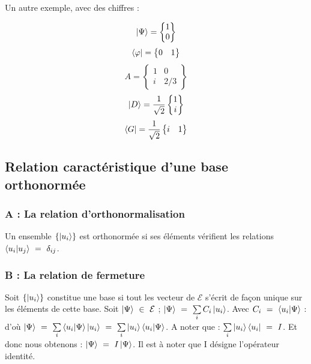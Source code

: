 \documentclass[12pt,a4paper,titlepage]{book}
\begin{document}
Un autre exemple, avec des chiffres :
\begin{center}
\[
\ket{\Psi}=
\left\lbrace
\begin{matrix}
1 \\
0
\end{matrix}
\right\rbrace
\]
\[
\bra{\varphi}=
\left\lbrace
\begin{matrix}
0 & 1\\
\end{matrix}
\right\rbrace
\]
\[
A=
\left\lbrace
\begin{matrix}
1 & 0\\
i & 2/3
\end{matrix}
\right\rbrace
\]
\[
\ket{D}=\frac{1}{\sqrt{2}}
\left\lbrace
\begin{matrix}
1\\
i
\end{matrix}
\right\rbrace
\]
\[
\bra{G}= \frac{1}{\sqrt{2}}
\left\lbrace
\begin{matrix}
i & 1\\
\end{matrix}
\right\rbrace
\]
\end{center}

\subsection{Relation caractéristique d'une base orthonormée}
\subsubsection{A : La relation d'orthonormalisation}

Un ensemble $\lbrace \ket{u_i} \rbrace$ est orthonormée si ses éléments vérifient les relations $\braket{u_i | u_j} ~=~ \delta_{ij}$.

\subsubsection{B : La relation de fermeture}

Soit $\lbrace \ket{u_i} \rbrace$ constitue une base si tout les vecteur de $\mathcal{E}$ s'écrit de façon unique sur les éléments de cette base. Soit $\ket{\Psi}~\in~ \mathcal{E}$ ; $\ket{\Psi} ~=~ \sum\limits_i C_i \ket{u_i}$. Avec $C_i ~=~ \braket{u_i | \Psi}$ : d'où $\ket{\Psi} ~=~ \sum\limits_i \braket{u_i | \Psi} \ket{u_i} ~=~ \sum\limits_i \ket{u_i} \braket{u_i | \Psi}$. A noter que : $\sum\limits_i \ket{u_i} \bra{u_i} ~=~ I$. Et donc nous obtenons : $\ket{\Psi} ~=~ I \ket{\Psi}$. Il est à noter que I désigne l'opérateur identité.
\end{document}

